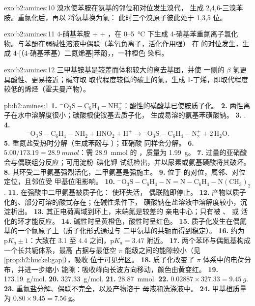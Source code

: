 \begin{solution}{exo:b2:amines:10}
溴水使苯胺在氨基的邻位和对位发生溴代，
生成 2,4,6-三溴苯胺。重氮化后，再以  将氨基换为氢：
此时三个溴原子彼此处于 1,3,5 位。
\end{solution}

\begin{solution}{exo:b2:amines:11}
4-硝基苯胺 +  + ，在 0--\qty{5}{\degreeCelsius} 下生成
4-硝基苯重氮离子氯化物。与苯酚在弱碱性溶液中偶联（苯氧负离子，活化作用强）
在  的对位发生，生成 4-[（4-硝基苯基）二氮烯基]苯酚，，一种橙色
染料。
\end{solution}

\begin{solution}{exo:b2:amines:12}
三甲基铵基是较差而体积较大的离去基团，并使
 一侧的 $\beta$ 氢更具酸性、更易接近；碱夺取
取代程度较低的碳上的氢，生成 1-丁烯，即取代程度较低的烯烃（霍夫曼产物）。
\end{solution}

\begin{solution}{pb:b2:amines:1}
\textbf{1.} $\mathrm{{}^-O_3S{-}C_6H_4{-}NH_3^+}$：酸性的磺酸基已使胺质子化。
\textbf{2.} 两性离子在水中溶解度很小；碳酸根使铵基去质子化，
生成易溶的氨基苯磺酸钠。
\textbf{3.} .
\textbf{4.}
\[
  \mathrm{{}^-O_3S{-}C_6H_4{-}NH_2 + HNO_2 + H^+ \to {}^-O_3S{-}C_6H_4{-}N_2^+ + 2\,H_2O} .
\]
\textbf{5.} 重氮盐受热时分解（生成苯酚与 ）；亚硝酸
同样会分解。
\textbf{6.} $5.00/173.19 = \qty{28.9}{mmol}$：需 \qty{28.9}{mmol} 的 ，质量为 \qty{1.99}{g}。
\textbf{7.} 过量的亚硝酸会与偶联组分反应；可用淀粉–碘化钾
试纸检出，并以尿素或氨基磺酸将其破坏。
\textbf{8.} 其环受二甲氨基强烈活化，二甲氨基是强施主。
\textbf{9.} 位于  的对位，属邻、对位定位，且邻位受
甲基位阻影响。
\textbf{10.} $\mathrm{{}^-O_3S{-}C_6H_4{-}N{=}N{-}C_6H_4{-}N(CH_3)_2}$.
\textbf{11.} 在强酸中二甲氨基被质子化： 使环失活，
偶联随即停止。
\textbf{12.} 产物以质子化的、部分可溶的酸式存在；在碱性条件下，
磺酸钠在盐溶液中溶解度较小，沉淀析出。
\textbf{13.} 其正电荷离域到环上，末端氮是较差的
亲电中心；只有被 、 或  活化的环才能反应。
\textbf{14.} 碱性时呈黄橙色，酸性时呈红色。
\textbf{15.} 质子化发生在偶氮基的一个氮原子上（质子化形式通过与
二甲氨基的共轭而得到稳定）。
\textbf{16.} 约为 $\mathrm pK_a \pm 1$：大致在 3.1 至 4.4 之间，$\mathrm pK_a = 3.47$ 附近。
\textbf{17.} 两个苯环与偶氮基构成一个长共轭体系，最高
占据与最低空 $\pi$ 能级之间的能隙较小（见\cref{prop:b2:huckel:gap}），吸收
位于可见光区。
\textbf{18.} 质子化改变了 $\pi$ 体系中的电荷分布，并进一步缩小
能隙：吸收峰向长波方向移动，颜色由黄变红。
\textbf{19.} \qty{173.19}{g/mol}.
\textbf{20.} \qty{327.33}{g/mol}.
\textbf{21.} \qty{28.87}{mmol}.
\textbf{22.} $0.02887 \times 327.33 = \qty{9.45}{g}$.
\textbf{23.} 重氮盐分解、偶联不完全，以及产物溶于
母液和洗涤液中。
\textbf{24.} 甲基橙质量为 $0.80 \times 9.45 = \boldsymbol{\qty{7.56}{g}}$。
\end{solution}
